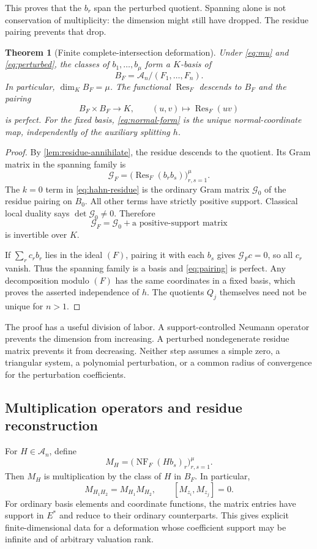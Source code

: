 \documentclass[11pt,letterpaper]{article}
\newtheorem{theorem}{Theorem}[section]
\theoremstyle{definition}
\theoremstyle{remark}
\newcommand{\A}{\mathscr A}
\newcommand{\Res}{\operatorname{Res}}
\newcommand{\NF}{\operatorname{NF}}
\numberwithin{equation}{section}
\begin{document}
This proves that the $b_r$ span the perturbed quotient. Spanning alone is not conservation of multiplicity: the dimension might still have dropped. The residue pairing prevents that drop.

\begin{theorem}[Finite complete-intersection deformation]\label{thm:finite-deform}
Under \eqref{eq:mu} and \eqref{eq:perturbed}, the classes of $b_1,\ldots,b_\mu$ form a $K$-basis of
\[
 B_F=\A_n/(F_1,\ldots,F_n).
\]
In particular, $\dim_K B_F=\mu$. The functional $\Res_F$ descends to $B_F$ and the pairing
\begin{equation}\label{eq:pairing}
 B_F\times B_F\longrightarrow K,
 \qquad (u,v)\longmapsto\Res_F(uv)
\end{equation}
is perfect. For the fixed basis, \eqref{eq:normal-form} is the unique normal-coordinate map, independently of the auxiliary splitting $h$.
\end{theorem}
\begin{proof}
By \cref{lem:residue-annihilate}, the residue descends to the quotient. Its Gram matrix in the spanning family is
\[
 \mathcal G_F=\bigl(\Res_F(b_rb_s)\bigr)_{r,s=1}^\mu.
\]
The $k=0$ term in \eqref{eq:hahn-residue} is the ordinary Gram matrix $\mathcal G_0$ of the residue pairing on $B_0$. All other terms have strictly positive support. Classical local duality says $\det\mathcal G_0\ne0$. Therefore
\[
 \mathcal G_F=\mathcal G_0+\text{a positive-support matrix}
\]
is invertible over $K$.

If $\sum_r c_rb_r$ lies in the ideal $(F)$, pairing it with each $b_s$ gives $\mathcal G_Fc=0$, so all $c_r$ vanish. Thus the spanning family is a basis and \eqref{eq:pairing} is perfect. Any decomposition modulo $(F)$ has the same coordinates in a fixed basis, which proves the asserted independence of $h$. The quotients $Q_j$ themselves need not be unique for $n>1$.
\end{proof}

The proof has a useful division of labor. A support-controlled Neumann operator prevents the dimension from increasing. A perturbed nondegenerate residue matrix prevents it from decreasing. Neither step assumes a simple zero, a triangular system, a polynomial perturbation, or a common radius of convergence for the perturbation coefficients.

\subsection{Multiplication operators and residue reconstruction}
For $H\in\A_n$, define
\begin{equation}\label{eq:multiplication-matrix}
 M_H=\bigl(\NF_F(Hb_s)_r\bigr)_{r,s=1}^\mu.
\end{equation}
Then $M_H$ is multiplication by the class of $H$ in $B_F$. In particular,
\[
 M_{H_1H_2}=M_{H_1}M_{H_2},\qquad
 [M_{z_i},M_{z_j}]=0.
\]
For ordinary basis elements and coordinate functions, the matrix entries have support in $E^*$ and reduce to their ordinary counterparts. This gives explicit finite-dimensional data for a deformation whose coefficient support may be infinite and of arbitrary valuation rank.
\end{document}
